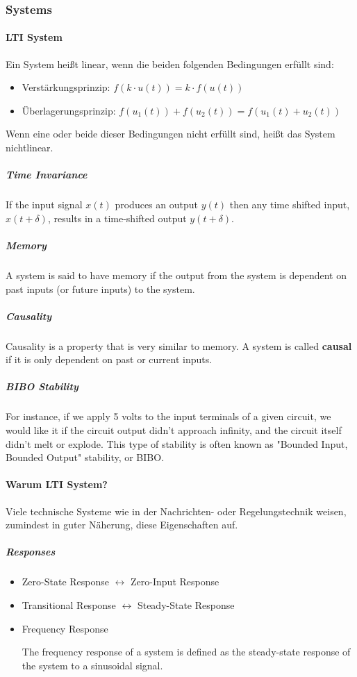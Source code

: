 \subsubsection{Systems}

\paragraph{LTI System} Ein System heißt linear, wenn die beiden folgenden Bedingungen erfüllt sind:

\begin{itemize}
  \item Verstärkungsprinzip: $f(k\cdot u(t))=k\cdot f(u(t))$
  \item Überlagerungsprinzip: $f\left(u_1\left(t\right)\right)+f\left(u_2\left(t\right)\right) =
f\left(u_1\left(t\right)+u_2\left(t\right)\right)$
\end{itemize}

Wenn eine oder beide dieser Bedingungen nicht erfüllt sind, heißt das System nichtlinear.

\subparagraph{Time Invariance} If the input signal $x(t)$ produces an output $y(t)$ then any time shifted input, $x(t + \delta)$, results in a time-shifted output $y(t + \delta)$.

\subparagraph{Memory} A system is said to have memory if the output from the system is dependent on past inputs (or future inputs) to the system.

\subparagraph{Causality} Causality is a property that is very similar to memory. A system is called \textbf{causal} if it is only dependent on past or current inputs.

\subparagraph{BIBO Stability} For instance, if we apply 5 volts to the input terminals of a given circuit, we would like it if the circuit output didn't approach infinity, and the circuit itself didn't melt or explode. This type of stability is often known as "Bounded Input, Bounded Output" stability, or BIBO.

\paragraph{Warum LTI System?}

Viele technische Systeme wie in der Nachrichten- oder Regelungstechnik weisen, zumindest in guter N\"aherung, diese Eigenschaften auf.

\subparagraph{Responses}
\begin{itemize}
  \item Zero-State Response $\leftrightarrow$ Zero-Input Response
  \item Transitional Response $\leftrightarrow$ Steady-State Response
  \item Frequency Response

  The frequency response of a system is defined as the steady-state response of the system to a sinusoidal signal.
\end{itemize}

